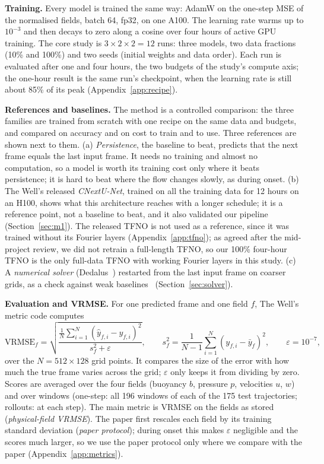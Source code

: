 \documentclass[11pt]{article}
\begin{document}
\textbf{Training.} Every model is trained the same way: AdamW on the one-step MSE of the normalised fields, batch
64, fp32, on one A100. The learning rate warms up to $10^{-3}$ and then decays to zero along a cosine over four hours
of active GPU training. The core study is $3\times2\times2=12$ runs: three models, two data fractions (10\% and
100\%) and two seeds (initial weights and data order). Each run is evaluated after one and four hours, the two
budgets of the study's compute axis; the one-hour result is the same run's checkpoint, when the learning rate is
still about 85\% of its peak (Appendix~\ref{app:recipe}).

\textbf{References and baselines.} The method is a controlled comparison: the three families are trained from
scratch with one recipe on the same data and budgets, and compared on accuracy and on cost to train and to use.
Three references are shown next to them. (a) \emph{Persistence}, the baseline to beat, predicts that the next frame
equals the last input frame. It needs no training and almost no computation, so a model is worth its training cost
only where it beats persistence; it is hard to beat where the flow changes slowly, as during onset. (b) The Well's
released \emph{CNextU-Net}, trained on all the training data for 12 hours on an H100, shows what this architecture
reaches with a longer schedule; it is a reference point, not a baseline to beat, and it also validated our pipeline
(Section~\ref{sec:m1}). The released TFNO is not used as a reference, since it was trained without its Fourier
layers (Appendix~\ref{app:tfno}); as agreed after the mid-project review, we did not retrain a full-length TFNO, so our
100\% four-hour TFNO is the only full-data TFNO with working Fourier layers in this study. (c) A \emph{numerical solver} (Dedalus~\cite{burns2020dedalus}) restarted from the
last input frame on coarser grids, as a check against weak baselines~\cite{mcgreivy2024weak}
(Section~\ref{sec:solver}).

\textbf{Evaluation and VRMSE.} For one predicted frame and one field $f$, The Well's metric code computes
\[
\mathrm{VRMSE}_f=\sqrt{\frac{\frac{1}{N}\sum_{i=1}^{N}(\hat y_{f,i}-y_{f,i})^2}{s_f^2+\varepsilon}},
\qquad s_f^2=\frac{1}{N-1}\sum_{i=1}^{N}(y_{f,i}-\bar y_f)^2,\qquad \varepsilon=10^{-7},
\]
over the $N=512\times128$ grid points. It compares the size of the error with how much the true frame varies across
the grid; $\varepsilon$ only keeps it from dividing by zero. Scores are averaged over the four fields (buoyancy $b$,
pressure $p$, velocities $u$, $w$) and over windows (one-step: all 196 windows of each of the 175 test trajectories;
rollouts: at each step). The main metric is VRMSE on the fields as stored (\emph{physical-field VRMSE}). The paper
first rescales each field by its training standard deviation (\emph{paper protocol}); during onset this makes
$\varepsilon$ negligible and the scores much larger, so we use the paper protocol only where we compare with the
paper (Appendix~\ref{app:metrics}).
\end{document}
